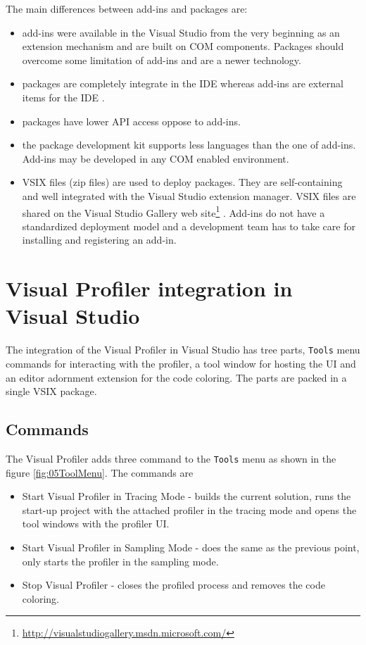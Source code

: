 The main differences between add-ins and packages are:
\begin{itemize}	
\item  add-ins were available in the Visual Studio from the very beginning as an extension mechanism and are built on COM components. Packages should overcome some limitation of add-ins and are a newer technology.

\item packages are completely integrate in the IDE whereas add-ins are external items for the IDE  .

\item packages have lower API access oppose to add-ins.

\item the package development kit supports less languages than the one of add-ins. Add-ins may be developed in any COM enabled environment.

\item VSIX files (zip files) are used to deploy packages. They are self-containing and well integrated with the Visual Studio extension manager. VSIX files are shared on the Visual Studio Gallery web site\footnote{\href{http://visualstudiogallery.msdn.microsoft.com/}{http://visualstudiogallery.msdn.microsoft.com/}}
. Add-ins do not have a standardized deployment model and a development team has to take care for installing and registering an add-in.
\end{itemize}


\section{Visual Profiler integration in Visual Studio}
The integration of the Visual Profiler in Visual Studio has tree parts, \texttt{Tools} menu commands for interacting with the profiler, a tool window for hosting the UI and an editor adornment extension for the code coloring. The parts are packed in a single VSIX package.

\subsection{Commands}
The Visual Profiler adds three command to the \texttt{Tools} menu as shown in the figure \ref{fig:05ToolMenu}. The commands are


\begin{itemize}
\item Start Visual Profiler in Tracing Mode - builds the current solution, runs the start-up project with the attached profiler in the tracing mode and opens the tool windows with the profiler UI.

\item Start Visual Profiler in Sampling Mode - does the same as the previous point, only  starts the profiler in the sampling mode.

\item Stop Visual Profiler - closes the profiled process and removes the code coloring.
\end{itemize}

